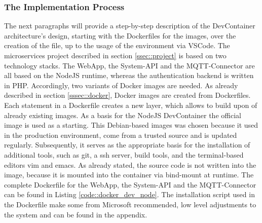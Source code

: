         \subsubsection{The Implementation Process}\label{ssec::imp_process}
        The next paragraphs will provide a step-by-step description of the DevContainer architecture's design, starting with the Dockerfiles for the images, over the creation of the  file, up to the usage of the environment via \ac{VSCode}.
        The microservices project described in section \ref{ssec::project} is based on two technology stacks. The WebApp, the System-\ac{API} and the MQTT-Connector are all based on the NodeJS runtime, whereas the authentication backend is written in PHP. Accordingly, two variants of Docker images are needed. As already described in section \ref{sssec::docker}, Docker images are created from Dockerfiles. Each statement in a Dockerfile creates a new layer, which allows to build upon of already existing images.\newline
        As a basis for the NodeJS DevContainer the official  image is used as a starting. This Debian-based images was chosen because it used in the production environment, come from a trusted source and is updated regularly. Subsequently, it serves as the appropriate basis for the installation of additional tools, such as git, a ssh server, build tools, and the terminal-based editors vim and emacs. As already stated, the source code is not written into the image, because it is mounted into the container via bind-mount at runtime. The complete Dockerfile for the WebApp, the System-\ac{API} and the MQTT-Connector can be found in Listing \ref{code::docker_dev_node}. The installation script used in the Dockerfile make some from Microsoft recommended, low level adjustments to the system and can be found in the appendix.\newline
        
